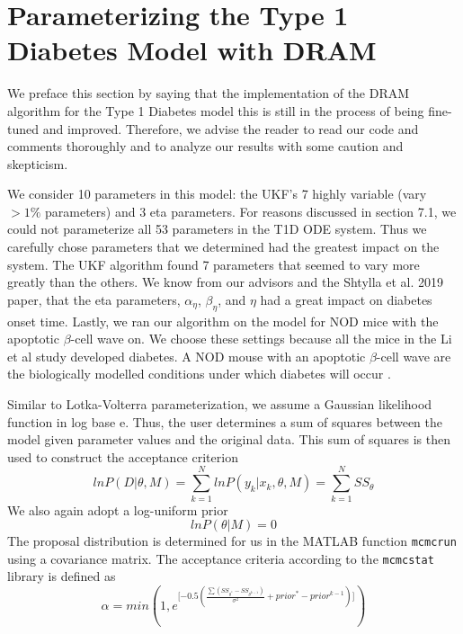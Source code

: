 \documentclass{article}
\begin{document}
\section{Parameterizing the Type 1 Diabetes Model with DRAM} \label{Parameterizing_T1D_DRAM}
We preface this section by saying that the implementation of the DRAM algorithm for the Type 1 Diabetes model this is still in the process of being fine-tuned and improved. Therefore, we advise the reader to read our code and comments thoroughly and to analyze our results with some caution and skepticism.
\par We consider 10 parameters in this model: the UKF's 7 highly variable (vary $> 1\%$ parameters) and 3 eta parameters. For reasons discussed in section 7.1, we could not parameterize all 53 parameters in the T1D ODE system. Thus we carefully chose parameters that we determined had the greatest impact on the system. The UKF algorithm found 7 parameters that seemed to vary more greatly than the others. We know from our advisors and the Shtylla et al. 2019 paper, that the eta parameters, $\alpha_{\eta}$, $\beta_{\eta}$, and $\eta$ had a great impact on diabetes onset time. Lastly, we ran our algorithm on the model for NOD mice with the apoptotic $\beta$-cell wave on. We choose these settings because all the mice in the Li et al study developed diabetes. A NOD mouse with an apoptotic $\beta$-cell wave are the biologically modelled conditions under which diabetes will occur \cite{shtylla2019mathematical}. 
\par Similar to Lotka-Volterra parameterization, we assume a Gaussian likelihood function in log base e. Thus, the user determines a sum of squares between the model given parameter values and the original data. This sum of squares is then used to construct the acceptance criterion
\begin{equation} \label{eq:19mcmc}
lnP(D|\theta, M) = \sum_{k=1}^{N}lnP(y_k|x_k,\theta,M) = \sum_{k=1}^N SS_\theta 
\end{equation}
 We also again adopt a log-uniform prior
\begin{equation} \label{eq:20mcmc}
lnP(\theta|M) = 0
\end{equation}
The proposal distribution is determined for us in the MATLAB function \texttt{mcmcrun} using a covariance matrix. The acceptance criteria according to the \texttt{mcmcstat} library is defined as
\begin{equation} \label{eq:21mcmc}
\alpha = min(1, e^{ \lbrack {-0.5(\frac{\sum (SS_{\theta^*}-SS_{\theta^{k-1}})}{\sigma^2} + prior^*-prior^{k-1})} \rbrack}) 
\end{equation}
\end{document}
